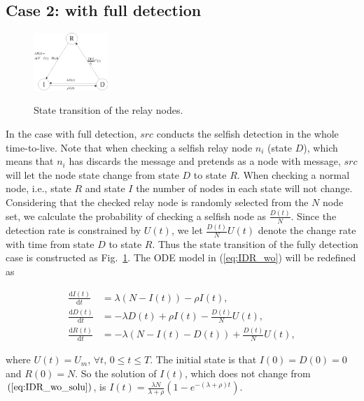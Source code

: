 \subsection{Case 2: with full detection}
\label{subsec:full_detc}
\begin{figure}
  \centering
  {\includegraphics[width=0.25\textwidth]
  {fig/state_transition_detect.eps}}
     \caption{State transition of the relay nodes.}
     \label{fig:ss_dt}
\end{figure}
In the case with full detection,
$src$ conducts the selfish detection in the whole time-to-live.
Note that when checking a selfish relay node $n_{i}$ (state $D$),
which means that $n_{i}$ has discards the message and pretends as a node with message,
$src$ will let the node state change from state $D$ to state $R$.
When checking a normal node, i.e., state $R$ and state $I$
the number of nodes in each state will not change.
Considering that the checked relay node is randomly selected from the $N$ node set,
we calculate the probability of checking a selfish node as $\frac{D(t)}{N}$.
Since the detection rate is constrained by $U(t)$,
we let $\frac{D(t)}{N}U(t)$
denote the change rate with time from state $D$ to state $R$.
Thus the state transition of the fully detection case is constructed as Fig.~\ref{fig:ss_dt}.
The ODE model in (\ref{eq:IDR_wo}) will be redefined as
\begin{small}
\begin{equation}
\label{eq:IDR_full}
\begin{aligned}
\frac{\mathrm{d} I(t)}{\mathrm{d} t} &=  \lambda (N-I(t)) - \rho I(t),\\
\frac{\mathrm{d} D(t)}{\mathrm{d} t} &= - \lambda D(t) + \rho I(t) - \frac{D(t)}{N} U(t),\\
\frac{\mathrm{d} R(t)}{\mathrm{d} t} &= - \lambda (N-I(t)-D(t)) + \frac{D(t)}{N} U(t),
\end{aligned}
\end{equation}
\end{small}
where $U(t) = U_{m}$, $\forall t$, $0 \le t \le T$.
The initial state is that $I(0)=D(0)=0$ and $R(0)=N$.
So the solution of $I(t)$, which does not change from $(\ref{eq:IDR_wo_solu})$,
is $I(t) = \frac{ \lambda N }{ \lambda + \rho }(1- e^{-(\lambda + \rho)t})$.
